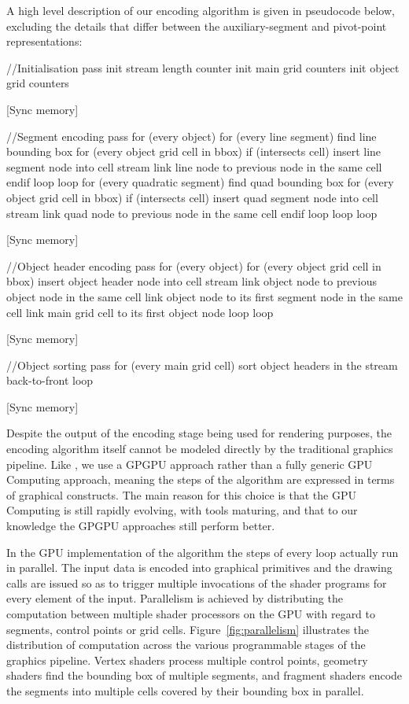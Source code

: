 \documentclass[11pt,a4paper,twoside]{article}
\newenvironment {code}{\footnotesize}{\normalsize}
\begin{document}
A high level description of our encoding algorithm is given in pseudocode below, excluding the details that differ between the auxiliary-segment and pivot-point representations:

\begin {code}
\begin {verbatimtab}[3]

//Initialisation pass
init stream length counter
init main grid counters
init object grid counters

[Sync memory]

//Segment encoding pass
for (every object)
	for (every line segment)
		find line bounding box
		for (every object grid cell in bbox)
			if (intersects cell)
				insert line segment node into cell stream
				link line node to previous node in the same cell
			endif
		loop
	loop
	for (every quadratic segment)
		find quad bounding box
		for (every object grid cell in bbox)
			if (intersects cell)
				insert quad segment node into cell stream
				link quad node to previous node in the same cell
			endif
		loop
	loop
loop

[Sync memory]

//Object header encoding pass
for (every object)
	for (every object grid cell in bbox)
		insert object header node into cell stream
		link object node to previous object node in the same cell
		link object node to its first segment node in the same cell
		link main grid cell to its first object node
	loop
loop

[Sync memory]

//Object sorting pass
for (every main grid cell)
	sort object headers in the stream back-to-front 
loop

[Sync memory]
\end {verbatimtab}
\end {code}

\pagebreak

Despite the output of the encoding stage being used for rendering purposes, the encoding algorithm itself cannot be modeled directly by the traditional graphics pipeline. Like \cite{NehabHoppe08}, we use a GPGPU approach rather than a fully generic GPU Computing approach, meaning the steps of the algorithm are expressed in terms of graphical constructs. The main reason for this choice is that the GPU Computing is still rapidly evolving, with tools maturing, and that to our knowledge the GPGPU approaches still perform better.

In the GPU implementation of the algorithm the steps of every loop actually run in parallel. The input data is encoded into graphical primitives and the drawing calls are issued so as to trigger multiple invocations of the shader programs for every element of the input. Parallelism is achieved by distributing the computation between multiple shader processors on the GPU with regard to segments, control points or grid cells. Figure~\ref{fig:parallelism} illustrates the distribution of computation across the various programmable stages of the graphics pipeline. Vertex shaders process multiple control points, geometry shaders find the bounding box of multiple segments, and fragment shaders encode the segments into multiple cells covered by their bounding box in parallel.
\end{document}

